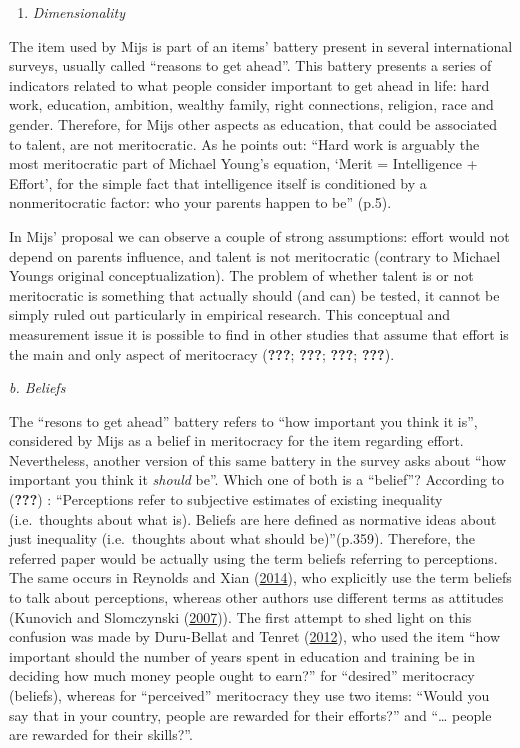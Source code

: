 \documentclass[
]{article}
\providecommand{\tightlist}{%
  \setlength{\itemsep}{0pt}\setlength{\parskip}{0pt}}
\begin{document}
\begin{enumerate}
\def\labelenumi{\alph{enumi}.}
\tightlist
\item
  \emph{Dimensionality}
\end{enumerate}

The item used by Mijs is part of an items' battery present in several international surveys, usually called ``reasons to get ahead''. This battery presents a series of indicators related to what people consider important to get ahead in life: hard work, education, ambition, wealthy family, right connections, religion, race and gender. Therefore, for Mijs other aspects as education, that could be associated to talent, are not meritocratic. As he points out: ``Hard work is arguably the most meritocratic part of Michael Young's equation, `Merit = Intelligence + Effort', for the simple fact that intelligence itself is conditioned by a nonmeritocratic factor: who your parents happen to be'' (p.5).

In Mijs' proposal we can observe a couple of strong assumptions: effort would not depend on parents influence, and talent is not meritocratic (contrary to Michael Youngs original conceptualization). The problem of whether talent is or not meritocratic is something that actually should (and can) be tested, it cannot be simply ruled out particularly in empirical research. This conceptual and measurement issue it is possible to find in other studies that assume that effort is the main and only aspect of meritocracy ({\textbf{???}}; {\textbf{???}}; {\textbf{???}}; {\textbf{???}}).

\emph{b. Beliefs}

The ``resons to get ahead'' battery refers to ``how important you think it is'', considered by Mijs as a belief in meritocracy for the item regarding effort. Nevertheless, another version of this same battery in the survey asks about ``how important you think it \emph{should} be''. Which one of both is a ``belief''? According to ({\textbf{???}}) : ``Perceptions refer to subjective estimates of existing inequality (i.e.~thoughts about what is). Beliefs are here defined as normative ideas about just inequality (i.e.~thoughts about what should be)''(p.359). Therefore, the referred paper would be actually using the term beliefs referring to perceptions. The same occurs in Reynolds and Xian (\protect\hyperlink{ref-reynolds_perceptions_2014}{2014}), who explicitly use the term beliefs to talk about perceptions, whereas other authors use different terms as attitudes (Kunovich and Slomczynski (\protect\hyperlink{ref-kunovich_systems_2007}{2007})). The first attempt to shed light on this confusion was made by Duru-Bellat and Tenret (\protect\hyperlink{ref-duru-bellat_whos_2012}{2012}), who used the item ``how important should the number of years spent in education and training be in deciding how much money people ought to earn?'' for ``desired'' meritocracy (beliefs), whereas for ``perceived'' meritocracy they use two items: ``Would you say that in your country, people are rewarded for their efforts?'' and ``\ldots{} people are rewarded for their skills?''.
\end{document}
